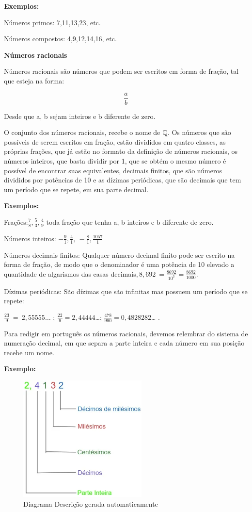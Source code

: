 \textbf{Exemplos:}

Números primos: 7,11,13,23, etc.

Números compostos: 4,9,12,14,16, etc.

\textbf{Números racionais}

Números racionais são números que podem ser escritos em forma de fração,
tal que esteja na forma:

\[\frac{a}{b}\]

Desde que a, b sejam inteiros e b diferente de zero.

O conjunto dos números racionais, recebe o nome de ℚ. Os números que são
possíveis de serem escritos em fração, estão divididos em quatro
classes, as próprias frações, que já estão no formato da definição de
números racionais, os números inteiros, que basta dividir por 1, que se
obtém o mesmo número é possível de encontrar suas equivalentes, decimais
finitos, que são números divididos por potências de 10 e as dízimas
periódicas, que são decimais que tem um período que se repete, em sua
parte decimal.

\textbf{Exemplos:}

Frações:\(\frac{7}{8},\frac{5}{3},\frac{4}{9}\) toda fração que tenha a,
b inteiros e b diferente de zero.

Números inteiros:
\(- \frac{9}{1},\frac{4}{1},\  - \frac{8}{1},\frac{1057}{1}\)

Números decimais finitos: Qualquer número decimal finito pode ser
escrito na forma de fração, de modo que o denominador é uma potência de
10 elevado a quantidade de algarismos das casas
decimais\(,8,692\  = \frac{8692}{10^{3}} = \frac{8692}{1000}\).

Dízimas periódicas: São dízimas que são infinitas mas possuem um período
que se repete: 


\(\frac{23}{9}\  = \ 2,55555\ldots\) ;
\(\frac{22}{9} = 2,44444\)\ldots;
\(\frac{478}{990} = 0,4828282\)\ldots{} .


Para redigir em português os números racionais, devemos relembrar do
sistema de numeração decimal, em que separa a parte inteira e cada
número em sua posição recebe um nome.~

\textbf{Exemplo:}

\begin{figure}
\centering
\includegraphics[width=2.54167in,height=2.5in]{./imgSAEB_7_MAT/media/image1.png}
\caption{Diagrama Descrição gerada automaticamente}
\end{figure}

